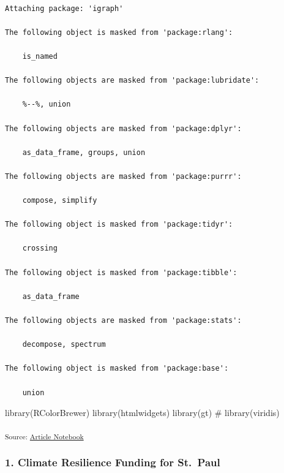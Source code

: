 \documentclass[
  letterpaper,
  DIV=11,
  numbers=noendperiod]{scrartcl}
\newenvironment{Shaded}{\begin{snugshade}}{\end{snugshade}}
\newcommand{\CommentTok}[1]{\textcolor[rgb]{0.37,0.37,0.37}{#1}}
\newcommand{\FunctionTok}[1]{\textcolor[rgb]{0.28,0.35,0.67}{#1}}
\newcommand{\NormalTok}[1]{\textcolor[rgb]{0.00,0.23,0.31}{#1}}
\begin{document}
\begin{verbatim}

Attaching package: 'igraph'

The following object is masked from 'package:rlang':

    is_named

The following objects are masked from 'package:lubridate':

    %--%, union

The following objects are masked from 'package:dplyr':

    as_data_frame, groups, union

The following objects are masked from 'package:purrr':

    compose, simplify

The following object is masked from 'package:tidyr':

    crossing

The following object is masked from 'package:tibble':

    as_data_frame

The following objects are masked from 'package:stats':

    decompose, spectrum

The following object is masked from 'package:base':

    union
\end{verbatim}

\begin{Shaded}
\begin{Highlighting}[]
\FunctionTok{library}\NormalTok{(RColorBrewer)}
\FunctionTok{library}\NormalTok{(htmlwidgets)}
\FunctionTok{library}\NormalTok{(gt)}
\CommentTok{\# library(viridis)}
\end{Highlighting}
\end{Shaded}

\textsubscript{Source:
\href{https://beeckcenter.github.io/climate-equity-workforce/index-preview.html}{Article
Notebook}}

\subsubsection{1. Climate Resilience Funding for
St.~Paul}\label{climate-resilience-funding-for-st.-paul}
\end{document}
